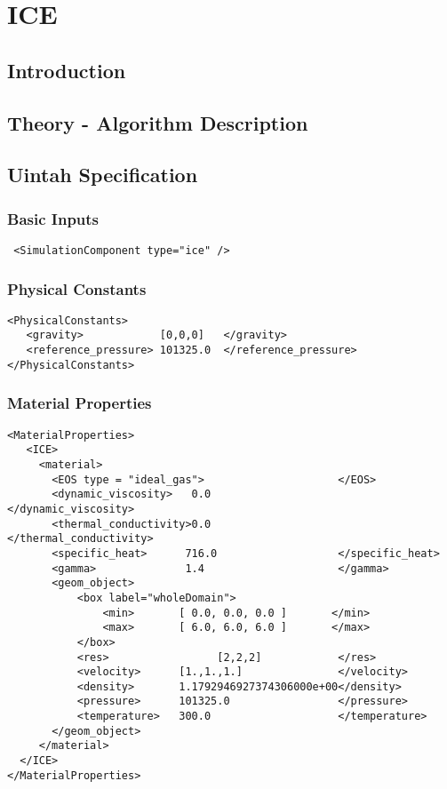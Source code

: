
\section{ICE} \label{Sec:ICE}

\subsection{Introduction}

\subsection{Theory - Algorithm Description}

\subsection{Uintah Specification}
\subsubsection{Basic Inputs}
\footnotesize
\begin{verbatim}
 <SimulationComponent type="ice" />
\end{verbatim}
\normalfont
\subsubsection{Physical Constants}
\footnotesize
\begin{verbatim}
<PhysicalConstants>
   <gravity>            [0,0,0]   </gravity>
   <reference_pressure> 101325.0  </reference_pressure>
</PhysicalConstants>
\end{verbatim}
\normalfont
\subsubsection{Material Properties}
\footnotesize
\begin{verbatim}
<MaterialProperties>
   <ICE>
     <material>
       <EOS type = "ideal_gas">                     </EOS>
       <dynamic_viscosity>   0.0                    </dynamic_viscosity>
       <thermal_conductivity>0.0                    </thermal_conductivity>
       <specific_heat>      716.0                   </specific_heat>
       <gamma>              1.4                     </gamma>
       <geom_object>
           <box label="wholeDomain">
               <min>       [ 0.0, 0.0, 0.0 ]       </min>
               <max>       [ 6.0, 6.0, 6.0 ]       </max>
           </box>
           <res>                 [2,2,2]            </res>
           <velocity>      [1.,1.,1.]               </velocity>
           <density>       1.1792946927374306000e+00</density>
           <pressure>      101325.0                 </pressure>     
           <temperature>   300.0                    </temperature>
       </geom_object>
     </material>
  </ICE>       
</MaterialProperties>
\end{verbatim}
\normalfont
